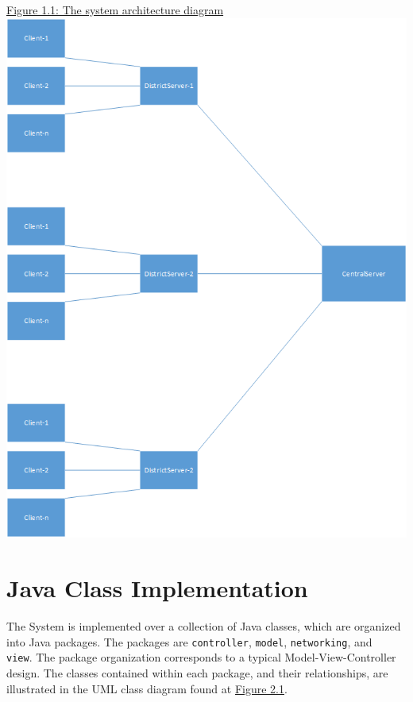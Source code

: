 \documentclass[11pt,english]{article}
\begin{document}
\newpage 
\underline{Figure 1.1: The system architecture diagram} 
\vspace{5mm}\\
\includegraphics[width=6.2in]{figures/FlowChart.png}


\section{Java Class Implementation}

The System is implemented over a collection of Java classes, which are organized into Java
packages. The packages are {\tt controller}, {\tt model}, {\tt networking}, and {\tt
view}. The package organization corresponds to a typical Model-View-Controller design. The
classes contained within each package, and their relationships, are illustrated in the UML
class diagram found at \underline{Figure 2.1}. \\
\end{document}
